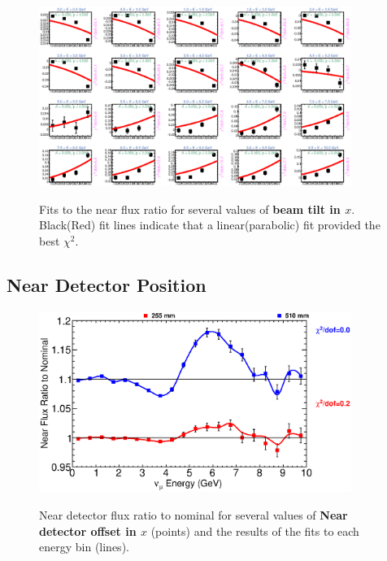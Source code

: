 \begin{figure}[hb]
  \begin{center}
    {\includegraphics[width=4.0in]{figures/Tilt_t_near_fits.eps}}
  \end{center}
\caption{ Fits to the near flux ratio for several values of {\bf beam tilt in $x$}. Black(Red) fit lines indicate that a linear(parabolic) fit provided the best $\chi^2$. }
\end{figure}

\clearpage
\subsection{Near Detector Position}

\begin{figure}[ht]
  \begin{center}
    {\includegraphics[width=4.0in]{figures/LBNENDX_near_summary.eps}}
  \end{center}
\caption{ Near detector flux ratio to nominal for several values of {\bf Near detector offset in $x$} (points) and the results of the fits to each energy bin (lines).}
\end{figure}

